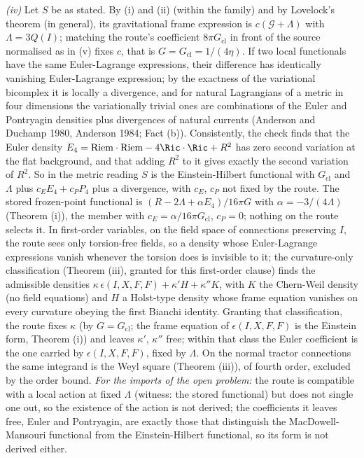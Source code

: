 \emph{(iv)} Let $S$ be as stated. By (i) and (ii) (within the family) and by Lovelock's theorem (in general), its gravitational frame expression is $c(\mathcal{G} + \Lambda)$ with $\Lambda = 3Q(I)$; matching the route's coefficient $8\pi G_{\mathrm{cl}}$ in front of the source normalised as in (v) fixes $c$, that is $G = G_{\mathrm{cl}} = 1/(4\eta)$. If two local functionals have the same Euler-Lagrange expressions, their difference has identically vanishing Euler-Lagrange expression; by the exactness of the variational bicomplex it is locally a divergence, and for natural Lagrangians of a metric in four dimensions the variationally trivial ones are combinations of the Euler and Pontryagin densities plus divergences of natural currents (Anderson and Duchamp 1980, Anderson 1984; Fact (b)). Consistently, the check finds that the Euler density $E_{4} = \mathrm{Riem}\cdot\mathrm{Riem} - 4\Ric\cdot\Ric + R^{2}$ has zero second variation at the flat background, and that adding $R^{2}$ to it gives exactly the second variation of $R^{2}$. So in the metric reading $S$ is the Einstein-Hilbert functional with $G_{\mathrm{cl}}$ and $\Lambda$ plus $c_{E}E_{4} + c_{P}P_{4}$ plus a divergence, with $c_{E}$, $c_{P}$ not fixed by the route. The stored frozen-point functional is $(R - 2\Lambda + \alpha E_{4})/16\pi G$ with $\alpha = -3/(4\Lambda)$ (Theorem (i)), the member with $c_{E} = \alpha/16\pi G_{\mathrm{cl}}$, $c_{P} = 0$; nothing on the route selects it. In first-order variables, on the field space of connections preserving $I$, the route sees only torsion-free fields, so a density whose Euler-Lagrange expressions vanish whenever the torsion does is invisible to it; the curvature-only classification (Theorem (iii), granted for this first-order clause) finds the admissible densities $\kappa\,\epsilon(I, X, F, F) + \kappa' H + \kappa'' K$, with $K$ the Chern-Weil density (no field equations) and $H$ a Holst-type density whose frame equation vanishes on every curvature obeying the first Bianchi identity. Granting that classification, the route fixes $\kappa$ (by $G = G_{\mathrm{cl}}$; the frame equation of $\epsilon(I, X, F, F)$ is the Einstein form, Theorem (i)) and leaves $\kappa'$, $\kappa''$ free; within that class the Euler coefficient is the one carried by $\epsilon(I, X, F, F)$, fixed by $\Lambda$. On the normal tractor connections the same integrand is the Weyl square (Theorem (iii)), of fourth order, excluded by the order bound. \emph{For the imports of the open problem:} the route is compatible with a local action at fixed $\Lambda$ (witness: the stored functional) but does not single one out, so the existence of the action is not derived; the coefficients it leaves free, Euler and Pontryagin, are exactly those that distinguish the MacDowell-Mansouri functional from the Einstein-Hilbert functional, so its form is not derived either.

